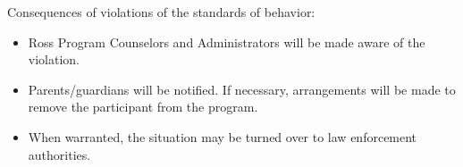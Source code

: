 \documentclass{ross}
\begin{document}
\pagebreak

Consequences of violations of the standards of behavior:
\begin{itemize}
\item Ross Program Counselors and Administrators will be made aware of
  the violation.
\item Parents/guardians will be notified. If necessary, arrangements
  will be made to remove the participant from the program.
\item When warranted, the situation may be turned over to law
  enforcement authorities.
\end{itemize}
\end{document}
